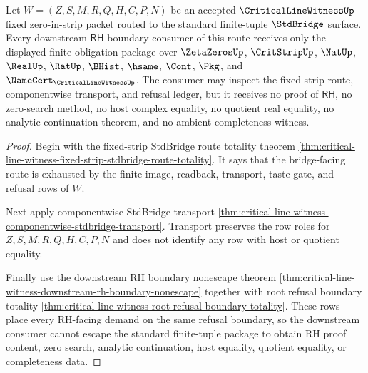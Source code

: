 \begin{theorem}
\label{thm:critical-line-witness-rh-boundary-stdbridge-nonescape}
Let $W=(Z,S,M,R,Q,H,C,P,N)$ be an accepted $\CriticalLineWitnessUp$ fixed zero-in-strip packet routed to the standard finite-tuple $\StdBridge$ surface. Every downstream $\mathsf{RH}$-boundary consumer of this route receives only the displayed finite obligation package over $\ZetaZerosUp$, $\CritStripUp$, $\NatUp$, $\RealUp$, $\RatUp$, $\BHist$, $\hsame$, $\Cont$, $\Pkg$, and $\NameCert_{\CriticalLineWitnessUp}$. The consumer may inspect the fixed-strip route, componentwise transport, and refusal ledger, but it receives no proof of $\mathsf{RH}$, no zero-search method, no host complex equality, no quotient real equality, no analytic-continuation theorem, and no ambient completeness witness.
\end{theorem}
\begin{proof}
Begin with the fixed-strip StdBridge route totality theorem \autoref{thm:critical-line-witness-fixed-strip-stdbridge-route-totality}. It says that the bridge-facing route is exhausted by the finite image, readback, transport, taste-gate, and refusal rows of $W$.

Next apply componentwise StdBridge transport \autoref{thm:critical-line-witness-componentwise-stdbridge-transport}. Transport preserves the row roles for $Z,S,M,R,Q,H,C,P,N$ and does not identify any row with host or quotient equality.

Finally use the downstream RH boundary nonescape theorem \autoref{thm:critical-line-witness-downstream-rh-boundary-nonescape} together with root refusal boundary totality \autoref{thm:critical-line-witness-root-refusal-boundary-totality}. These rows place every RH-facing demand on the same refusal boundary, so the downstream consumer cannot escape the standard finite-tuple package to obtain RH proof content, zero search, analytic continuation, host equality, quotient equality, or completeness data.
\end{proof}
